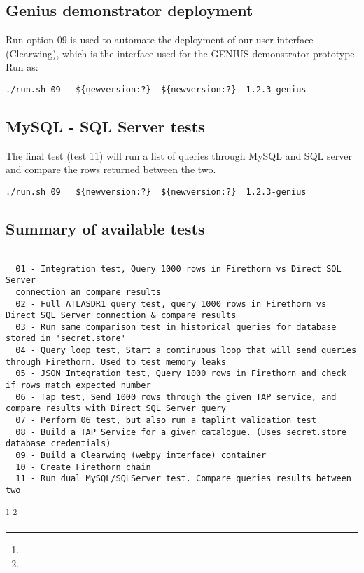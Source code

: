 \documentclass[review,5p,authoryear,12pt]{elsarticle}
\begin{document}
\subsection{Genius demonstrator deployment}
Run option 09 is used to automate the deployment of our user interface (Clearwing), which is the interface used for the GENIUS demonstrator prototype.
Run as: 
\begin{verbatim}
./run.sh 09   ${newversion:?}  ${newversion:?} 	1.2.3-genius 
\end{verbatim}

\subsection{MySQL - SQL Server tests}
The final test (test 11) will run a list of queries through MySQL and SQL server and compare the rows returned between the two.
\begin{verbatim}
./run.sh 09   ${newversion:?}  ${newversion:?} 	1.2.3-genius 
\end{verbatim}


\subsection{Summary of available tests}
\begin{verbatim}

  01 - Integration test, Query 1000 rows in Firethorn vs Direct SQL Server
  connection an compare results 
  02 - Full ATLASDR1 query test, query 1000 rows in Firethorn vs Direct SQL Server connection & compare results
  03 - Run same comparison test in historical queries for database stored in 'secret.store'
  04 - Query loop test, Start a continuous loop that will send queries through Firethorn. Used to test memory leaks
  05 - JSON Integration test, Query 1000 rows in Firethorn and check if rows match expected number
  06 - Tap test, Send 1000 rows through the given TAP service, and compare results with Direct SQL Server query
  07 - Perform 06 test, but also run a taplint validation test
  08 - Build a TAP Service for a given catalogue. (Uses secret.store database credentials)
  09 - Build a Clearwing (webpy interface) container
  10 - Create Firethorn chain
  11 - Run dual MySQL/SQLServer test. Compare queries results between two
\end{verbatim}

\footnote{}
\footnote{}
\end{document}

